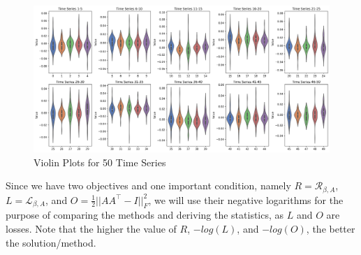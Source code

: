 \begin{figure}[H]
  \centering
  \includegraphics[width=\textwidth]{images/violin_plots_50_timeseries.png}
  \caption{Violin Plots for 50 Time Series}
  \label{fig:violin_plots}
\end{figure}


Since we have two objectives and one important condition, namely $R = \mathcal{R}_{\beta, A}$, $L = \mathcal{L}_{\beta, A}$, and $O = \frac{1}{2}||AA^\top -I||^2_F$, we will use their negative logarithms for the purpose of comparing the methods and deriving the statistics, as $L$ and $O$ are losses. Note that the higher the value of $R$, $-log(L)$, and $-log(O)$, the better the solution/method.

